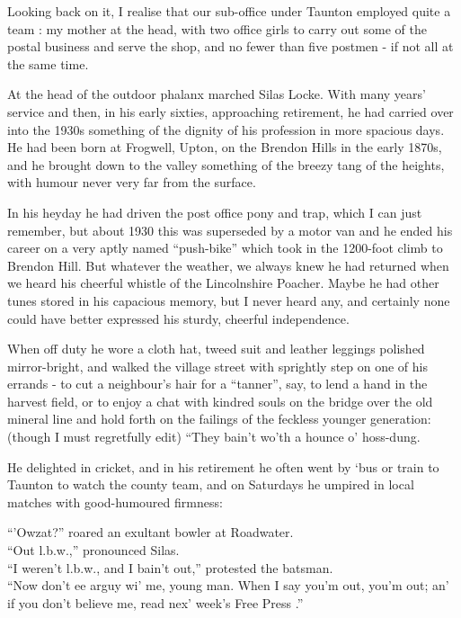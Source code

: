 Looking back on it, I realise that our sub-office under Taunton employed quite a team : my mother at the head, with two office girls to carry out some of the postal business and serve the shop, and no fewer than five postmen - if not all at the same time.

At the head of the outdoor phalanx marched Silas Locke. With many years’ service and then, in his early sixties, approaching retirement, he had carried over into the 1930s something of the dignity of his profession in more spacious days. He had been born at Frogwell, Upton, on the Brendon Hills in the early 1870s, and he brought down to the valley something of the breezy tang of the heights, with humour never very far from the surface.

In his heyday he had driven the post office pony and trap, which I can just remember, but about 1930 this was superseded by a motor van and he ended his career on a very aptly named “push-bike” which took in the 1200-foot climb to Brendon Hill. But whatever the weather, we always knew he had returned when we heard his cheerful whistle of the Lincolnshire Poacher. Maybe he had other tunes stored in his capacious memory, but I never heard any, and certainly none could have better expressed his sturdy, cheerful independence.
 
When off duty he wore a cloth hat, tweed suit and leather leggings polished mirror-bright, and walked the village street with sprightly step on one of his errands - to cut a neighbour’s hair for a “tanner”, say, to lend a hand in the harvest field, or to enjoy a chat with kindred souls on the bridge over the old mineral line and hold forth on the failings of the feckless younger generation:(though I must regretfully edit) “They bain’t wo’th a hounce o’ hoss-dung.
 
 He delighted in cricket, and in his retirement he often went by ‘bus or train to Taunton to watch the county team, and on Saturdays he umpired in local matches with good-humoured firmness:
 
 “’Owzat?” roared an exultant bowler at Roadwater. \\
 “Out l.b.w.,” pronounced Silas.\\
 “I weren’t l.b.w., and I bain’t out,” protested the batsman.\\
 “Now don’t ee arguy wi’ me, young man. When I say you’m out, you’m out; an’ if you don’t believe me, read nex’ week’s Free Press .”\\

\Flourish

